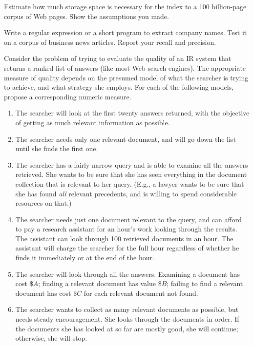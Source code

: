\begin{iexercise}
Estimate how much storage space is necessary for the index to a
100 billion-page corpus of Web pages.  Show the assumptions you made.
\end{iexercise} 



\begin{exercise}\prgex
Write a regular expression or a short program to extract company
names. Test it on a corpus of business news articles. Report your
recall and precision.
\end{exercise} 

\begin{exercise}
Consider the problem of trying to evaluate the quality of an IR system that
returns a ranked list of answers (like most Web search engines). The 
appropriate measure of quality depends on the presumed model of what the searcher
is trying to achieve, and what strategy she employs.
For each of the
following models, propose a corresponding numeric measure.

\begin{enumerate}
\item The searcher will look at the first twenty answers returned, with the
objective of getting as much relevant information as possible.
\item The searcher needs only one relevant document, and will go down the list
until she finds the first one. 
\item The searcher has a fairly narrow query and is able to examine all the
answers retrieved. She wants to be sure that she has seen everything in the
document collection that is relevant to her query. (E.g., a lawyer wants to be
sure that she has found {\em all\/} relevant precedents, and is willing to
spend considerable resources on that.) 
\item The searcher needs just one document relevant to the query, and can 
afford to
pay a research assistant for an hour's work looking through the results.
The assistant can look through 100 retrieved documents in an hour. 
The assistant will charge the searcher for the full hour regardless of whether
he finds it immediately or at the end of the hour.
\item The searcher will look through all the answers. Examining a document
has cost \$$A$; finding a relevant document has value \$$B$; failing to
find a relevant document has cost \$$C$ for each relevant document not found.
\item The searcher wants to collect as many relevant documents as possible,
but needs steady encouragement. She looks through the documents in order. If the
documents she has looked at so far are mostly good, she will continue; otherwise, she will stop.
\end{enumerate}

\end{exercise} 


